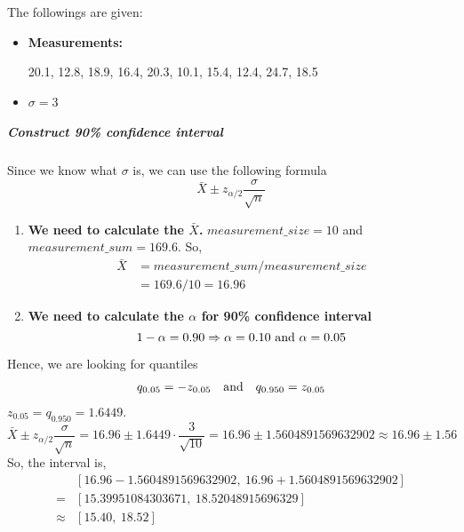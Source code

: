 The followings are given:
\begin{itemize}[leftmargin=.6cm]
  \item \textbf{Measurements:}
  \begin{center}20.1, 12.8, 18.9, 16.4, 20.3, 10.1, 15.4, 12.4, 24.7, 18.5\end{center}
  \item $\sigma = 3$
\end{itemize}

\subparagraph{Construct 90\% confidence interval}

Since we know what $\sigma$ is, we can use the following formula
\begin{equation*}
  \bar{X} \pm z_{\alpha/2} \frac{\sigma}{\sqrt{n}}
\end{equation*}

\begin{enumerate}[leftmargin=.6cm]
  \item 
\textbf{We need to calculate the $\bar{X}$.} $measurement\_size = 10$ and $measurement\_sum = 169.6$. So, 
\begin{align*}
  \bar{X} &= measurement\_sum / measurement\_size\\
          &= 169.6 / 10 = 16.96
\end{align*}

\item  
\textbf{We need to calculate the $\alpha$ for 90\% confidence interval}
\begin{equation*}
  1 - \alpha = 0.90 \Rightarrow \alpha = 0.10 \textnormal{ and } \alpha = 0.05
\end{equation*}
\end{enumerate}

\noindent Hence, we are looking for quantiles
\begin{align*}
  &q_{0.05} = -z_{0.05} &\textnormal{and}& &q_{0.950} = z_{0.05}
\end{align*}
$z_{0.05} = q_{0.950} = 1.6449$.
\begin{equation*}
  \bar{X} \pm z_{\alpha/2} \frac{\sigma}{\sqrt{n}} = 16.96 \pm 1.6449 \cdot \frac{3}{\sqrt{10}} = 16.96 \pm 1.5604891569632902 \approx 16.96 \pm 1.56
\end{equation*}
So, the interval is,
\begin{align*}
  &\left[ 16.96 - 1.5604891569632902,\ 16.96 + 1.5604891569632902 \right]\\
  =&\left[ 15.39951084303671,\ 18.52048915696329 \right]\\
  \approx&\left[ 15.40,\ 18.52 \right]
\end{align*}


